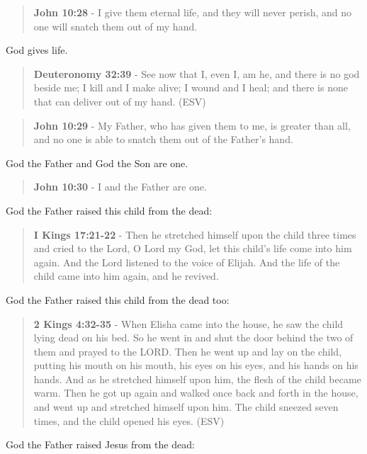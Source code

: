 \documentclass[11pt]{article}
\begin{document}
\begin{quote}
\textbf{John 10:28} - I give them eternal life, and they will never perish, and no one will snatch them out of my hand.
\end{quote}

God gives life.

\begin{quote}
\textbf{Deuteronomy 32:39} - See now that I, even I, am he, and there is no god beside me; I kill and I make alive; I wound and I heal; and there is none that can deliver out of my hand. (ESV)
\end{quote}

\begin{quote}
\textbf{John 10:29} - My Father, who has given them to me, is greater than all, and no one is able to snatch them out of the Father's hand.
\end{quote}

God the Father and God the Son are one.

\begin{quote}
\textbf{John 10:30} - I and the Father are one.
\end{quote}

God the Father raised this child from the dead:

\begin{quote}
\textbf{I Kings 17:21-22} - Then he stretched himself upon the child three times and cried to the Lord, O Lord my God, let this child's life come into him again. And the Lord listened to the voice of Elijah. And the life of the child came into him again, and he revived.
\end{quote}

God the Father raised this child from the dead too:

\begin{quote}
\textbf{2 Kings 4:32-35} -  When Elisha came into the house, he saw the child lying dead on his bed.  So he went in and shut the door behind the two of them and prayed to the LORD.  Then he went up and lay on the child, putting his mouth on his mouth, his eyes on his eyes, and his hands on his hands.  And as he stretched himself upon him, the flesh of the child became warm.  Then he got up again and walked once back and forth in the house, and went up and stretched himself upon him. The child sneezed seven times, and the child opened his eyes.  (ESV)
\end{quote}

God the Father raised Jesus from the dead:
\end{document}

